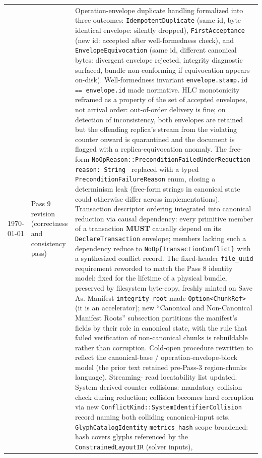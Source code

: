 \documentclass[11pt,letterpaper]{report}
\newcounter{requirement}[chapter]
\newcommand{\MUST}{\textbf{MUST}}
\begin{document}
\begin{longtable}{p{2cm} p{2.5cm} p{9cm}}
  \today & Pass 9 revision (correctness and consistency pass) &
  Operation-envelope duplicate handling formalized into three
  outcomes: \texttt{IdempotentDuplicate} (same id, byte-identical
  envelope: silently dropped), \texttt{FirstAcceptance} (new id:
  accepted after well-formedness check), and
  \texttt{EnvelopeEquivocation} (same id, different canonical
  bytes: divergent envelope rejected, integrity diagnostic
  surfaced, bundle non-conforming if equivocation appears
  on-disk). Well-formedness invariant
  \texttt{envelope.stamp.id == envelope.id} made normative. HLC
  monotonicity reframed as a property of the set of accepted
  envelopes, not arrival order: out-of-order delivery is fine;
  on detection of inconsistency, both envelopes are retained but
  the offending replica's stream from the violating counter
  onward is quarantined and the document is flagged with a
  replica-equivocation anomaly. The free-form
  \texttt{NoOpReason::PreconditionFailedUnderReduction { reason:
  String }} replaced with a typed \texttt{PreconditionFailureReason}
  enum, closing a determinism leak (free-form strings in
  canonical state could otherwise differ across implementations).
  Transaction descriptor ordering integrated into canonical
  reduction via causal dependency: every primitive member of a
  transaction \MUST{} causally depend on its
  \texttt{DeclareTransaction} envelope; members lacking such a
  dependency reduce to \texttt{NoOp\{TransactionConflict\}} with
  a synthesized conflict record. The fixed-header
  \texttt{file\_uuid} requirement reworded to match the Pass 8
  identity model: fixed for the lifetime of a physical bundle,
  preserved by filesystem byte-copy, freshly minted on Save As.
  Manifest \texttt{integrity\_root} made \texttt{Option<ChunkRef>}
  (it is an accelerator); new ``Canonical and Non-Canonical
  Manifest Roots'' subsection partitions the manifest's fields
  by their role in canonical state, with the rule that failed
  verification of non-canonical chunks is rebuildable rather
  than corruption. Cold-open procedure rewritten to reflect the
  canonical-base / operation-envelope-block model (the prior
  text retained pre-Pass-3 region-chunks language). Streaming-
  read locatability list updated. System-derived counter
  collisions: mandatory collision check during reduction;
  collision becomes hard corruption via new
  \texttt{ConflictKind::SystemIdentifierCollision} record naming
  both colliding canonical-input sets. \texttt{GlyphCatalogIdentity}
  \texttt{metrics\_hash} scope broadened: hash covers glyphs
  referenced by the \texttt{ConstrainedLayoutIR} (solver inputs),

\end{longtable}
\end{document}
